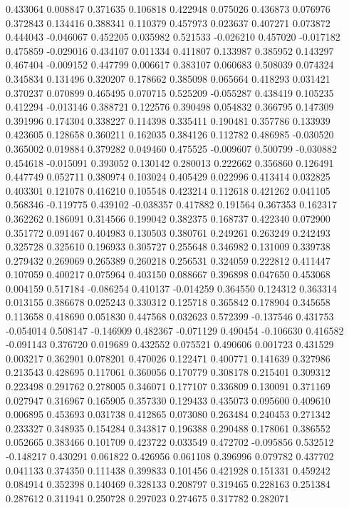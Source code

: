 0.433064
0.008847
0.371635
0.106818
0.422948
0.075026
0.436873
0.076976
0.372843
0.134416
0.388341
0.110379
0.457973
0.023637
0.407271
0.073872
0.444043
-0.046067
0.452205
0.035982
0.521533
-0.026210
0.457020
-0.017182
0.475859
-0.029016
0.434107
0.011334
0.411807
0.133987
0.385952
0.143297
0.467404
-0.009152
0.447799
0.006617
0.383107
0.060683
0.508039
0.074324
0.345834
0.131496
0.320207
0.178662
0.385098
0.065664
0.418293
0.031421
0.370237
0.070899
0.465495
0.070715
0.525209
-0.055287
0.438419
0.105235
0.412294
-0.013146
0.388721
0.122576
0.390498
0.054832
0.366795
0.147309
0.391996
0.174304
0.338227
0.114398
0.335411
0.190481
0.357786
0.133939
0.423605
0.128658
0.360211
0.162035
0.384126
0.112782
0.486985
-0.030520
0.365002
0.019884
0.379282
0.049460
0.475525
-0.009607
0.500799
-0.030882
0.454618
-0.015091
0.393052
0.130142
0.280013
0.222662
0.356860
0.126491
0.447749
0.052711
0.380974
0.103024
0.405429
0.022996
0.413414
0.032825
0.403301
0.121078
0.416210
0.105548
0.423214
0.112618
0.421262
0.041105
0.568346
-0.119775
0.439102
-0.038357
0.417882
0.191564
0.367353
0.162317
0.362262
0.186091
0.314566
0.199042
0.382375
0.168737
0.422340
0.072900
0.351772
0.091467
0.404983
0.130503
0.380761
0.249261
0.263249
0.242493
0.325728
0.325610
0.196933
0.305727
0.255648
0.346982
0.131009
0.339738
0.279432
0.269069
0.265389
0.260218
0.256531
0.324059
0.222812
0.411447
0.107059
0.400217
0.075964
0.403150
0.088667
0.396898
0.047650
0.453068
0.004159
0.517184
-0.086254
0.410137
-0.014259
0.364550
0.124312
0.363314
0.013155
0.386678
0.025243
0.330312
0.125718
0.365842
0.178904
0.345658
0.113658
0.418690
0.051830
0.447568
0.032623
0.572399
-0.137546
0.431753
-0.054014
0.508147
-0.146909
0.482367
-0.071129
0.490454
-0.106630
0.416582
-0.091143
0.376720
0.019689
0.432552
0.075521
0.490606
0.001723
0.431529
0.003217
0.362901
0.078201
0.470026
0.122471
0.400771
0.141639
0.327986
0.213543
0.428695
0.117061
0.360056
0.170779
0.308178
0.215401
0.309312
0.223498
0.291762
0.278005
0.346071
0.177107
0.336809
0.130091
0.371169
0.027947
0.316967
0.165905
0.357330
0.129433
0.435073
0.095600
0.409610
0.006895
0.453693
0.031738
0.412865
0.073080
0.263484
0.240453
0.271342
0.233327
0.348935
0.154284
0.343817
0.196388
0.290488
0.178061
0.386552
0.052665
0.383466
0.101709
0.423722
0.033549
0.472702
-0.095856
0.532512
-0.148217
0.430291
0.061822
0.426956
0.061108
0.396996
0.079782
0.437702
0.041133
0.374350
0.111438
0.399833
0.101456
0.421928
0.151331
0.459242
0.084914
0.352398
0.140469
0.328133
0.208797
0.319465
0.228163
0.251384
0.287612
0.311941
0.250728
0.297023
0.274675
0.317782
0.282071
